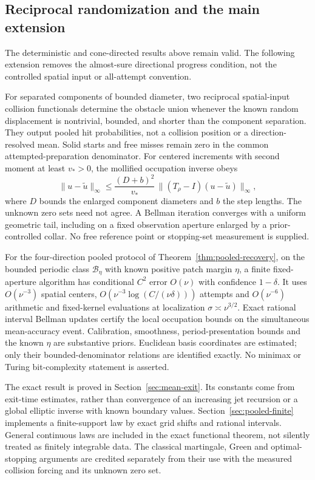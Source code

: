 \subsection*{Reciprocal randomization and the main extension}
The deterministic and cone-directed results above remain valid. The
following extension removes the almost-sure directional progress
condition, not the controlled spatial input or all-attempt convention.

\begin{reciprocaltheorem}
For separated components of bounded diameter, two reciprocal spatial-input
collision functionals determine the obstacle union whenever the known
random displacement is nontrivial, bounded, and shorter than the
component separation. They output pooled hit probabilities, not a
collision position or a direction-resolved mean. Solid starts and free
misses remain zero in the common attempted-preparation denominator.
For centered increments with second moment at least $v_*>0$, the
mollified occupation inverse obeys
\[
 \|u-\widetilde u\|_\infty\le
       \frac{(D+b)^2}{v_*}\,
       \|(T_\rho-I)(u-\widetilde u)\|_\infty,
\]
where $D$ bounds the enlarged component diameters and $b$ the step
lengths. The unknown zero sets need not agree. A Bellman iteration
converges with a uniform geometric tail, including on a fixed observation
aperture enlarged by a prior-controlled collar. No free reference point
or stopping-set measurement is supplied.

For the four-direction pooled protocol of
Theorem~\ref{thm:pooled-recovery}, on the bounded periodic class
$\mathcal B_\eta$ with known positive patch margin $\eta$, a finite
fixed-aperture algorithm has conditional $C^2$ error $O(\nu)$ with
confidence $1-\delta$. It uses $O(\nu^{-3})$ spatial centers,
$O(\nu^{-3}\log(C/(\nu\delta)))$ attempts and $O(\nu^{-6})$
arithmetic and fixed-kernel evaluations at localization
$\sigma\asymp\nu^{3/2}$. Exact rational interval Bellman updates
certify the local occupation bounds on the simultaneous mean-accuracy
event. Calibration, smoothness, period-presentation bounds and the
known $\eta$ are substantive priors. Euclidean basis coordinates are
estimated; only their bounded-denominator relations are identified
exactly. No minimax or Turing bit-complexity statement is asserted.
\end{reciprocaltheorem}

The exact result is proved in Section~\ref{sec:mean-exit}. Its constants
come from exit-time estimates, rather than convergence of an increasing
jet recursion or a global elliptic inverse with known boundary values.
Section~\ref{sec:pooled-finite} implements a finite-support law by exact
grid shifts and rational intervals. General continuous laws are included
in the exact functional theorem, not silently treated as finitely
integrable data. The classical martingale, Green and optimal-stopping
arguments are credited separately from their use with the measured
collision forcing and its unknown zero set.

